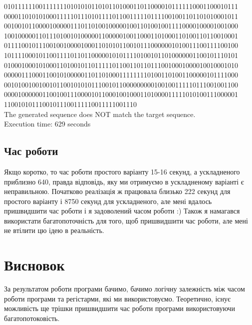 \documentclass[12pt]{article}
\begin{document}
\begin{itemize}
0101111110011111110101010110101101000110110000101111110001100010111 \\
0000110101010001111101110101111011001111101111001001101101010001011 \\
0010010110000100000111011010010000010011010010011110000100001001000 \\
1001000001101110100101000001100000100110001101000110100110110010001 \\
0111100101110010010000100011010101100101110000001010011100111100100 \\
1011110001011001111011011000001010111101001011010000001100101110101 \\
0100010001010001101001011011111011001101101110010001000010010001010 \\
0000011100011001010000011011010001111111101001101001100000101111000 \\
0010100100100101100101010111001011000000000100100111110111001001100 \\
0000100000011001001110000101100010010001101000011111010100111000001 \\
11001010111001011100111110011111001110 \\
The generated sequence does NOT match the target sequence. \\
Execution time: 629 seconds \\
\end{itemize}

\subsection {Час роботи}
\quad Якщо коротко, то час роботи простого варіанту 15-16 секунд, а ускладненого приблизно 640, правда відповідь, яку ми отримуємо в ускладненому варіанті є неправильною. Початково реалізація ж працювала близько 222 секунд для простого варіанту і 8750 секунд для ускладненого, але мені вдалось пришвидшити час роботи і я задоволений часом роботи :) Також я намагався використати багатопоточність для того, щоб пришвидшити час роботи, але мені не втілити цю ідею в реальність. 

\section{Висновок}
\quad За результатом роботи програми бачимо, бачимо логічну залежність між часом роботи програми та регістарми, які ми використовуємо. Теоретично, існує можливість ще трішки пришвидшити час роботи програми використовуючи багатопотоковість. 
\end{document}

